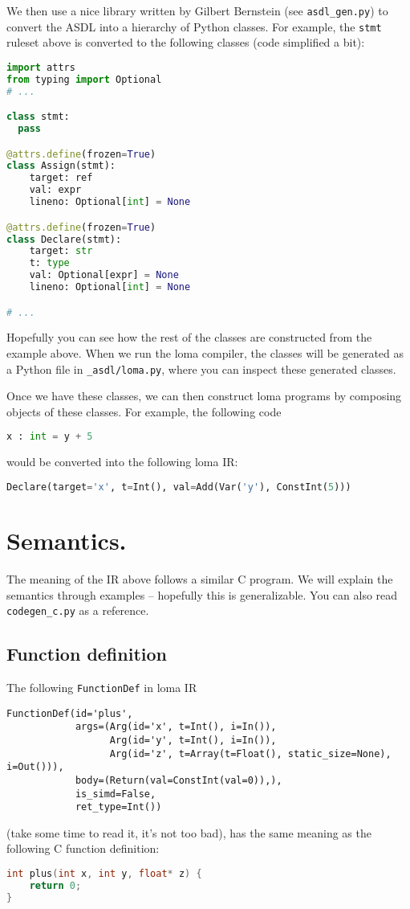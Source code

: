 We then use a nice library written by Gilbert Bernstein (see \lstinline{asdl_gen.py}) to convert the ASDL into a hierarchy of Python classes. For example, the \lstinline{stmt} ruleset above is converted to the following classes (code simplified a bit):
\begin{lstlisting}[language=python]
import attrs
from typing import Optional
# ...

class stmt:
  pass

@attrs.define(frozen=True)
class Assign(stmt):
    target: ref
    val: expr
    lineno: Optional[int] = None

@attrs.define(frozen=True)
class Declare(stmt):
    target: str
    t: type
    val: Optional[expr] = None
    lineno: Optional[int] = None

# ...
\end{lstlisting}
Hopefully you can see how the rest of the classes are constructed from the example above. When we run the loma compiler, the classes will be generated as a Python file in \lstinline{_asdl/loma.py}, where you can inspect these generated classes. 

Once we have these classes, we can then construct loma programs by composing objects of these classes. For example, the following code
\begin{lstlisting}[language=python]
x : int = y + 5
\end{lstlisting}
would be converted into the following loma IR:
\begin{lstlisting}[language=python]
Declare(target='x', t=Int(), val=Add(Var('y'), ConstInt(5)))
\end{lstlisting}

\section{Semantics.}
The meaning of the IR above follows a similar C program. We will explain the semantics through examples -- hopefully this is generalizable. You can also read \lstinline{codegen_c.py} as a reference.

\subsection{Function definition} 
The following \lstinline{FunctionDef} in loma IR
\begin{lstlisting}
FunctionDef(id='plus',
            args=(Arg(id='x', t=Int(), i=In()),
                  Arg(id='y', t=Int(), i=In()),
                  Arg(id='z', t=Array(t=Float(), static_size=None), i=Out())),
            body=(Return(val=ConstInt(val=0)),),
            is_simd=False,
            ret_type=Int())
\end{lstlisting}
(take some time to read it, it's not too bad), has the same meaning as the following C function definition:
\begin{lstlisting}[language=C]
int plus(int x, int y, float* z) {
    return 0;
}
\end{lstlisting}

